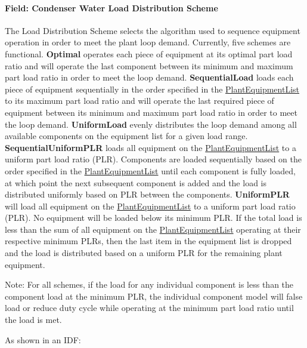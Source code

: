 \paragraph{Field: Condenser Water Load Distribution Scheme}\label{field-condenser-water-load-distribution-scheme}

The Load Distribution Scheme selects the algorithm used to sequence equipment operation in order to meet the plant loop demand. Currently, five schemes are functional. \textbf{Optimal} operates each piece of equipment at its optimal part load ratio and will operate the last component between its minimum and maximum part load ratio in order to meet the loop demand. \textbf{SequentialLoad} loads each piece of equipment sequentially in the order specified in the \hyperref[plantequipmentlist]{PlantEquipmentList} to its maximum part load ratio and will operate the last required piece of equipment between its minimum and maximum part load ratio in order to meet the loop demand. \textbf{UniformLoad} evenly distributes the loop demand among all available components on the equipment list for a given load range. \textbf{SequentialUniformPLR} loads all equipment on the \hyperref[plantequipmentlist]{PlantEquipmentList} to a uniform part load ratio (PLR). Components are loaded sequentially based on the order specified in the \hyperref[plantequipmentlist]{PlantEquipmentList} until each component is fully loaded, at which point the next subsequent component is added and the load is distributed uniformly based on PLR between the components. \textbf{UniformPLR} will load all equipment on the \hyperref[plantequipmentlist]{PlantEquipmentList} to a uniform part load ratio (PLR). No equipment will be loaded below its minimum PLR. If the total load is less than the sum of all equipment on the \hyperref[plantequipmentlist]{PlantEquipmentList} operating at their respective minimum PLRs, then the last item in the equipment list is dropped and the load is distributed based on a uniform PLR for the remaining plant equipment.

Note: For all schemes, if the load for any individual component is less than the component load at the minimum PLR, the individual component model will false load or reduce duty cycle while operating at the minimum part load ratio until the load is met.

As shown in an IDF:

